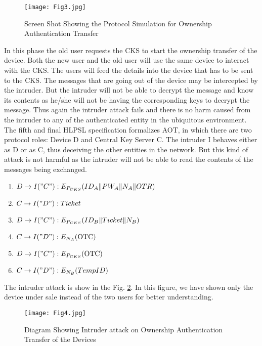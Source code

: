 \documentclass[letterpaper]{article}
\begin{document}
\begin{figure}[bpht!]
\centering
\texttt{[image: Fig3.jpg]}
\caption{Screen Shot Showing the Protocol Simulation for Ownership Authentication Transfer }
\label{fig:3}
\end{figure} 

In this phase the old user requests the CKS to start the ownership transfer of the device. Both the new user and the old user will use the same device to interact with the CKS. The users will feed the details into the device that has to be sent to the CKS. The messages that are going out of the device may be intercepted by the intruder. But the intruder will not be able to decrypt the message and know its contents as he/she will not be having the corresponding keys to decrypt the message. Thus again the intruder attack fails and there is no harm caused from the intruder to any of the authenticated entity in the ubiquitous environment. 
The fifth and final HLPSL specification formalizes AOT, in which there are two protocol roles: Device D and Central Key Server C. The intruder I behaves either as D or as C, thus deceiving the other entities in the network. But this kind of attack is not harmful as the intruder will not be able to read the contents of the messages being exchanged.
\begin{enumerate}
	\item $D \rightarrow I ("C") : E_{P_{CKS}} (ID_{A} \| PW_A \| N_A\| OTR)$
	\item $C \rightarrow I ("D") : Ticket$
	\item $D \rightarrow I ("C") : E_{P_{CKS}}(ID_{B} \| Ticket \| N_B)$
	\item $C \rightarrow I ("D") : E_{N_{A}}(\mbox{OTC})$
	\item $D \rightarrow I ("C") : E_{P_{CKS}}(\mbox{OTC})$
	\item $C \rightarrow I ("D") : E_{N_{B}}(TempID)$
\end{enumerate}
The intruder attack is show in the Fig. \ref{fig:4}. In this figure, we have shown only the device under sale instead of the two users for better understanding. 
\begin{figure}[bpht!]
\centering
\texttt{[image: Fig4.jpg]}
\caption{Diagram Showing Intruder attack on Ownership Authentication Transfer of the Devices}
\label{fig:4}
\end{figure}
\end{document}
